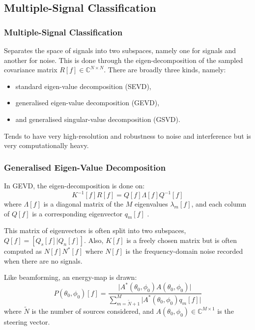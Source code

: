 \documentclass{beamer}
\begin{document}
\begin{frame}
\begin{columns}
\end{columns}

\end{frame}

\subsection{Multiple-Signal Classification}

\begin{frame}
\frametitle{Multiple-Signal Classification}

Separates the space of signals into two subspaces, namely one for signals and another for noise. This is done through the eigen-decomposition of the sampled covariance matrix $R[f]\in \mathbb{C}^{N\times N}$. There are broadly three kinds, namely:
\begin{itemize}
	\item standard eigen-value decomposition (SEVD),
	\item generalised eigen-value decomposition (GEVD),
	\item and generalised singular-value decomposition (GSVD).
\end{itemize}

Tends to have very high-resolution and robustness to noise and interference but is very computationally heavy.

\end{frame}

\begin{frame}
\frametitle{Generalised Eigen-Value Decomposition}

In GEVD, the eigen-decomposition is done on:
\begin{equation}
K^{-1}[f] R[f] = Q[f] \Lambda[f] Q^{-1}[f]
\end{equation}
\tiny{where $\Lambda[f]$ is a diagonal matrix of the $M$ eigenvalues $\lambda_m[f]$, and each column of $Q[f]$ is a corresponding eigenvector $q_m[f]$ \cite{nakamura_real-time_2012}.}\\\small

This matrix of eigenvectors is often split into two subspaces, $Q[f] = [Q_s[f]|Q_n[f]]$. Also, $K[f]$ is a freely chosen matrix but is often computed as $N[f]N^*[f]$ where $N[f]$ is the frequency-domain noise recorded when there are no signals.

Like beamforming, an energy-map is drawn:
\begin{equation}
P(\theta_0, \phi_0)[f] = \frac{\lvert A^*(\theta_0, \phi_0) A(\theta_0, \phi_0) \rvert}
	{\sum_{m=\tilde{N}+1}^M \lvert A^*(\theta_0, \phi_0) q_m[f] \rvert}
\end{equation}
\tiny{where $\tilde{N}$ is the number of sources considered, and $A(\theta_0, \phi_0)\in \mathbb{C}^{M\times 1}$ is the steering vector.}\\\small

\end{frame}
\end{document}
